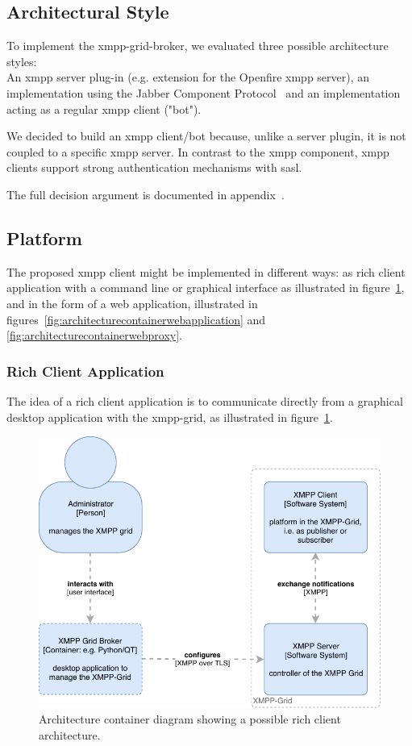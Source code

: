 \subsection{Architectural Style}

To implement the \gls{xmpp-grid-broker}, we evaluated three possible architecture styles:\hfill\\
An \gls{xmpp} server plug-in (e.g. extension for the Openfire \gls{xmpp} server), an implementation using the Jabber Component Protocol~\cite{xep-0114} and an implementation acting as a regular \gls{xmpp} client ("bot").

We decided to build an \gls{xmpp} client/bot because, unlike a server plugin, it is not coupled to a specific \gls{xmpp} server.
In contrast to the \gls{xmpp} component, \gls{xmpp} clients support strong authentication mechanisms with \gls{sasl}.

The full decision argument is documented in appendix~.

\subsection{Platform}

The proposed \gls{xmpp} client might be implemented in different ways: as rich client application with a command line or graphical interface as illustrated in figure~\ref{fig:architecturecontainerrichclient}, and in the form of a web application, illustrated in figures~\ref{fig:architecturecontainerwebapplication} and \ref{fig:architecturecontainerwebproxy}.

\subsubsection{Rich Client Application}

The idea of a rich client application is to communicate directly from a graphical desktop application with the \gls{xmpp-grid}, as illustrated in figure~\ref{fig:architecturecontainerrichclient}.

\begin{figure}[h]
\centering
\includegraphics[width=0.7\linewidth]{resources/architecture_container_rich_client}
\caption[Architecture container diagram: Rich client]{Architecture container diagram showing a possible rich client architecture.}
\label{fig:architecturecontainerrichclient}
\end{figure}

